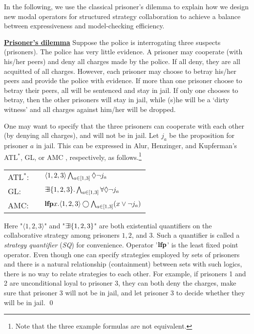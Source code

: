 In the following, we use the classical prisoner's dilemma to explain how we design new modal operators for structured strategy collaboration to achieve a balance between expressiveness and model-checking efficiency.

{ \label{exmp.pd} \underline{\bf Prisoner's dilemma}} 
Suppose the police is interrogating three suspects (prisoners).  
The police has very little evidence.  
A prisoner may cooperate (with his/her peers) and deny all charges made by the police. 
If all deny, they are all acquitted of all charges.  
However, each prisoner may choose to betray his/her peers
and provide the police with evidence.
If more than one prisoner choose to betray their peers, all will be sentenced and stay in jail.
If only one chooses to betray, then the other prisoners will stay in jail, while (s)he will be a `dirty witness' and all charges against him/her will be dropped.

One may want to specify that the three prisoners can cooperate with each other (by denying all charges), and will not be in jail.  
Let $j_a$ be the proposition for prisoner $a$ in jail.  
This can be expressed in Alur, Henzinger, and Kupferman's ATL$^*$, GL, or AMC \cite{AHK02}, respectively, as follows.\footnote{Note that the three example formulas are not equivalent.}  
\begin{center} 
\begin{tabular}{lll} 
ATL$^*$: 
& &  $\langle 1,2,3\rangle\bigwedge_{a\in[1,3]}\Diamond \neg j_a$ \\
GL: 
& & $\mbox{$\exists\!\!\exists$}\{1,2,3\}.\bigwedge_{a\in[1,3]}\forall\Diamond\neg j_a$ \\
AMC: 
& & $\mbox{\bf lfp} x.\langle 1,2,3\rangle \bigcirc 
\bigwedge_{a\in[1,3]}(x\vee \neg j_a)$
\end{tabular} 
\end{center} 
Here "$\langle 1,2,3\rangle$" and 
"$\mbox{$\exists\!\!\exists$}\{1,2,3\}$" are both existential 
quantifiers on the collaborative strategy among prisoners $1,2$, and $3$.  
Such a quantifier is called a {\em strategy quantifier} ({\em SQ}) for convenience.
Operator '$\mbox{\bf lfp}$' is the least fixed point operator.  
Even though one can specify strategies employed by sets of prisoners and there is a natural relationship (containment) between sets with such logics, there is no way to relate strategies to each other.
For example, if prisoners 1 and 2 are unconditional loyal to prisoner 3, they can both deny the charges, make sure that prisoner 3 will not be in jail, and let prisoner 3 to decide whether they will be in jail.
\qed

